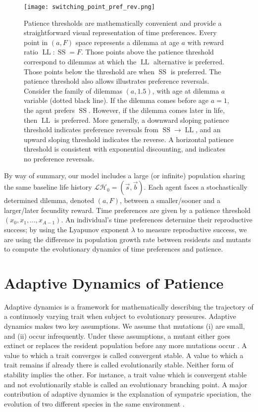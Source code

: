 \documentclass[titlepage, hidelinks, 12pt]{article}
\theoremstyle{plain}
\theoremstyle{remark}
\theoremstyle{definition}
\newcommand{\LH}{\mathcal{LH}}
\DeclareMathOperator{\smallersooner}{SS}
\DeclareMathOperator{\largerlater}{LL}
\begin{document}
\begin{figure}[H]
    \centering
    \texttt{[image: switching\_point\_pref\_rev.png]}
    \caption[Patience threshold and alternative perspective on preference reversals.]{Patience thresholds are mathematically convenient and provide a straightforward visual representation of time preferences. 
        Every point in $(a, F)$ space
    represents a dilemma at age $a$ with reward ratio $\largerlater : \smallersooner = F$. 
    Those points above the patience threshold correspond to dilemmas at which the $\largerlater$ alternative
is preferred. Those points below the threshold are when $\smallersooner$ is preferred. The patience threshold also allows
illustrates preference reversals. Consider the family of dilemmas $(a, 1.5)$, with age at dilemma $a$ variable (dotted black line). If the dilemma comes 
before age $a = 1$, the agent 
prefers $\smallersooner$. However, if the dilemma comes later in life, then $\largerlater$ is preferred. More generally, a
downward sloping patience threshold indicates preference reversals from $\smallersooner\to\largerlater$, and an upward sloping threshold
indicates the reverse. A horizontal patience threshold is consistent with exponential discounting, and indicates no preference reversals.
}
\end{figure}

By way of summary, our model includes a large (or infinite) population sharing the same baseline life history $\LH_0 = (\vec{s}, \vec{b}).$ 
Each agent faces a stochastically determined dilemma, denoted $(a, F)$, between a smaller/sooner and a larger/later fecundity reward. 
Time preferences are given by a patience threshold $(x_0, x_1, \ldots, x_{A-1})$. 
An individual's time preferences determine their reproductive success; by using the Lyapunov exponent $\lambda$ to measure reproductive 
success, we are using the difference in population growth rate between residents and mutants to compute the evolutionary dynamics of time
preferences and patience. 


\section{Adaptive Dynamics of Patience}
Adaptive dynamics is a framework for mathematically describing the trajectory of a continuosly varying trait when subject to evolutionary pressures. 
Adaptive dynamics makes two key assumptions. We assume that mutations (i) are small, and (ii) occur infrequently.
Under these assumptions, a mutant either goes extinct or replaces the resident population before any more mutations occur \cite{doebeli05}.
A value to which a trait converges is called convergent stable. A value to which a trait remains if already there is called evolutionarily stable.
Neither form of stability implies the other. For instance, a trait value which is convergent stable and not evolutionarily stable is called an
evolutionary branching point. A major contribution of adaptive dynamics is the explanation of sympatric speciation, the 
evolution of two different species in the same environment \cite{doebeli11}. 
\end{document}
